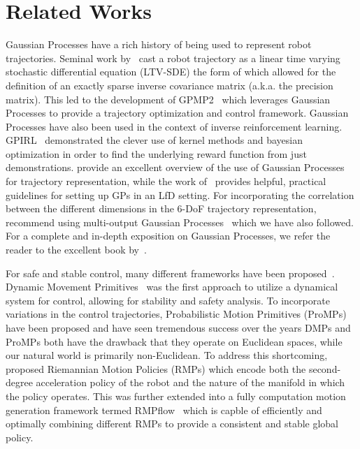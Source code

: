 \section{Related Works}
Gaussian Processes have a rich history of being used to represent robot trajectories. Seminal work by~\citet{Barfoot14rss} cast a robot trajectory as a linear time varying stochastic differential equation (LTV-SDE) the form of which allowed for the definition of an exactly sparse inverse covariance matrix (a.k.a. the precision matrix). This led to the development of GPMP2~\cite{Mukadam18ijrr} which leverages Gaussian Processes to provide a trajectory optimization and control framework.
Gaussian Processes have also been used in the context of inverse reinforcement learning. GPIRL~\citet{Levine11neurips} demonstrated the clever use of kernel methods and bayesian optimization in order to find the underlying reward function from just demonstrations.
\citet{Nguyen21arxiv} provide an excellent overview of the use of Gaussian Processes for trajectory representation, while the work of~\citet{Arduengo20arxiv} provides helpful, practical guidelines for setting up GPs in an LfD setting.
For incorporating the correlation between the different dimensions in the 6-DoF trajectory representation,~\citet{Arduengo20arxiv} recommend using multi-output Gaussian Processes~\cite{Bonilla07neurips} which we have also followed. For a complete and in-depth exposition on Gaussian Processes, we refer the reader to the excellent book by~\citet{Rasmussen04book}.

For safe and stable control, many different frameworks have been proposed~\cite{Duchaine09icra}. Dynamic Movement Primitives~\cite{Ijspeert13nc} was the first approach to utilize a dynamical system for control, allowing for stability and safety analysis.
To incorporate variations in the control trajectories, Probabilistic Motion Primitives (ProMPs)~\cite{Paraschos13neurips} have been proposed and have seen tremendous success over the years
DMPs and ProMPs both have the drawback that they operate on Euclidean spaces, while our natural world is primarily non-Euclidean. To address this shortcoming,~\citet{Ratliff18arxiv} proposed Riemannian Motion Policies (RMPs) which encode both the second-degree acceleration policy of the robot and the nature of the manifold in which the policy operates.
This was further extended into a fully computation motion generation framework termed RMPflow~\cite{Cheng21tase} which is capble of efficiently and optimally combining different RMPs to provide a consistent and stable global policy.

